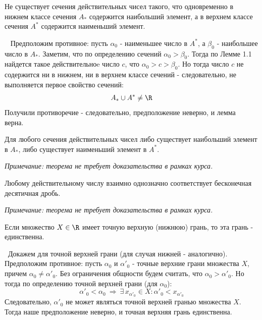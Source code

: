 \begin{lemma}
    Не существует сечения действительных чисел такого,
    что одновременно в нижнем классе сечения \(A_{*}\) содержится наибольший элемент,
    а в верхнем классе сечения \(A^{*}\) содержится наименьший элемент.

    \vspace{2mm}

    \proofname~ Предположим противное: пусть \(\alpha_{0}\) - наименьшее число в \(A^{*}\), а 
    \(\beta_{0}\) - наибольшее число в \(A_{*}\). Заметим, что по определению сечений 
    \(\alpha_{0} > \beta_{0}\).
    Тогда по Лемме 1.1 найдется такое действительноe число \(c\), что 
    \(\alpha_{0} > c > \beta_{0}\). Но тогда число \(c\) не содержится ни в нижнем,
    ни в верхнем классе сечений - следовательно, не выполняется первое свойство сечений:
    \[A_{*}\cup A^{*} \neq \R\]
    Получили противоречие - следовательно, предположение неверно, и лемма верна.~\qedsymbol
\end{lemma}

\begin{theorem}
    Для любого сечения действительных чисел либо существует наибольший элемент в \(A_{*}\),
    либо существует наименьший элемент в \(A^{*}\). 

    \vspace{2mm}

    \textit{Примечание: теорема не требует доказательства в рамках курса.}
\end{theorem}

\begin{theorem}
    Любому действительному числу взаимно однозначно соответствует бесконечная десятичная дробь.

    \vspace{2mm}

    \textit{Примечание: теорема не требует доказательства в рамках курса.}
\end{theorem}


\begin{theorem}
    Если множество \(X\in\R\) имеет точную верхную (нижнюю) грань, то эта грань - единственна.

    \vspace{2mm}

    \proofname~Докажем для точной верхней грани (для случая нижней - аналогично).\\
    Предположим противное: пусть \(\alpha_{0}\) и \(\alpha'_{0}\) - 
    точные верхние грани множества \(X\), причем \(\alpha_{0}\neq\alpha'_{0}\).
    Без ограничения общности будем считать, что \(\alpha_{0}>\alpha'_{0}\).
    Но тогда по определению точной верхней грани (для \(\alpha_{0}\)):
    \[\alpha'_{0} < \alpha_{0} ~ \Rightarrow ~ \exists\,x_{\alpha'_{0}}\in X: 
    \alpha'_{0} < x_{\alpha'_{0}}\]
    Следовательно, \(\alpha'_{0}\) не может являться точной верхней гранью множества \(X\).
    Тогда наше предположение неверно, и точная верхняя грань единственна.~\qedsymbol
\end{theorem}

